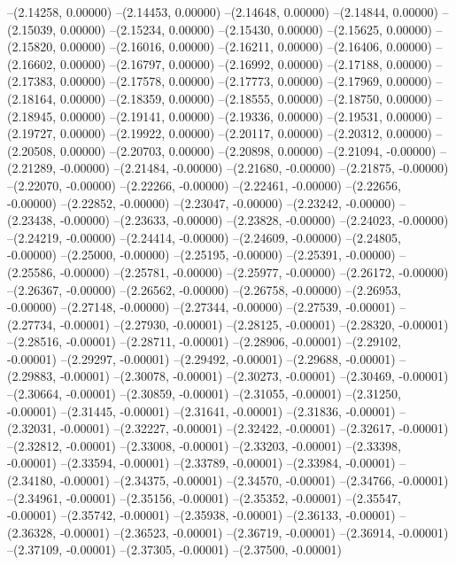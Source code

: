 --(2.14258, 0.00000)
--(2.14453, 0.00000)
--(2.14648, 0.00000)
--(2.14844, 0.00000)
--(2.15039, 0.00000)
--(2.15234, 0.00000)
--(2.15430, 0.00000)
--(2.15625, 0.00000)
--(2.15820, 0.00000)
--(2.16016, 0.00000)
--(2.16211, 0.00000)
--(2.16406, 0.00000)
--(2.16602, 0.00000)
--(2.16797, 0.00000)
--(2.16992, 0.00000)
--(2.17188, 0.00000)
--(2.17383, 0.00000)
--(2.17578, 0.00000)
--(2.17773, 0.00000)
--(2.17969, 0.00000)
--(2.18164, 0.00000)
--(2.18359, 0.00000)
--(2.18555, 0.00000)
--(2.18750, 0.00000)
--(2.18945, 0.00000)
--(2.19141, 0.00000)
--(2.19336, 0.00000)
--(2.19531, 0.00000)
--(2.19727, 0.00000)
--(2.19922, 0.00000)
--(2.20117, 0.00000)
--(2.20312, 0.00000)
--(2.20508, 0.00000)
--(2.20703, 0.00000)
--(2.20898, 0.00000)
--(2.21094, -0.00000)
--(2.21289, -0.00000)
--(2.21484, -0.00000)
--(2.21680, -0.00000)
--(2.21875, -0.00000)
--(2.22070, -0.00000)
--(2.22266, -0.00000)
--(2.22461, -0.00000)
--(2.22656, -0.00000)
--(2.22852, -0.00000)
--(2.23047, -0.00000)
--(2.23242, -0.00000)
--(2.23438, -0.00000)
--(2.23633, -0.00000)
--(2.23828, -0.00000)
--(2.24023, -0.00000)
--(2.24219, -0.00000)
--(2.24414, -0.00000)
--(2.24609, -0.00000)
--(2.24805, -0.00000)
--(2.25000, -0.00000)
--(2.25195, -0.00000)
--(2.25391, -0.00000)
--(2.25586, -0.00000)
--(2.25781, -0.00000)
--(2.25977, -0.00000)
--(2.26172, -0.00000)
--(2.26367, -0.00000)
--(2.26562, -0.00000)
--(2.26758, -0.00000)
--(2.26953, -0.00000)
--(2.27148, -0.00000)
--(2.27344, -0.00000)
--(2.27539, -0.00001)
--(2.27734, -0.00001)
--(2.27930, -0.00001)
--(2.28125, -0.00001)
--(2.28320, -0.00001)
--(2.28516, -0.00001)
--(2.28711, -0.00001)
--(2.28906, -0.00001)
--(2.29102, -0.00001)
--(2.29297, -0.00001)
--(2.29492, -0.00001)
--(2.29688, -0.00001)
--(2.29883, -0.00001)
--(2.30078, -0.00001)
--(2.30273, -0.00001)
--(2.30469, -0.00001)
--(2.30664, -0.00001)
--(2.30859, -0.00001)
--(2.31055, -0.00001)
--(2.31250, -0.00001)
--(2.31445, -0.00001)
--(2.31641, -0.00001)
--(2.31836, -0.00001)
--(2.32031, -0.00001)
--(2.32227, -0.00001)
--(2.32422, -0.00001)
--(2.32617, -0.00001)
--(2.32812, -0.00001)
--(2.33008, -0.00001)
--(2.33203, -0.00001)
--(2.33398, -0.00001)
--(2.33594, -0.00001)
--(2.33789, -0.00001)
--(2.33984, -0.00001)
--(2.34180, -0.00001)
--(2.34375, -0.00001)
--(2.34570, -0.00001)
--(2.34766, -0.00001)
--(2.34961, -0.00001)
--(2.35156, -0.00001)
--(2.35352, -0.00001)
--(2.35547, -0.00001)
--(2.35742, -0.00001)
--(2.35938, -0.00001)
--(2.36133, -0.00001)
--(2.36328, -0.00001)
--(2.36523, -0.00001)
--(2.36719, -0.00001)
--(2.36914, -0.00001)
--(2.37109, -0.00001)
--(2.37305, -0.00001)
--(2.37500, -0.00001)
